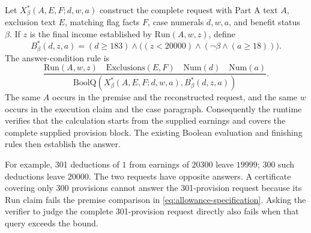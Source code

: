\documentclass[11pt,twoside]{article}
\theoremstyle{definition}
\begin{document}
Let $X^*_{\beta}(A,E,F;d,w,a)$ construct the complete request with Part A text
$A$, exclusion text $E$, matching flag facts $F$, case numerals $d,w,a$, and
benefit status $\beta$. If $z$ is the final income established by
$\mathrm{Run}(A,w,z)$, define
\begin{equation}
 B^*_{\beta}(d,z,a)
   =(d\ge183)\wedge\bigl((z<20000)\wedge(\neg\beta\wedge(a\ge18))\bigr).
\end{equation}
The answer-condition rule is
\begin{equation}
 \frac{\mathrm{Run}(A,w,z)\quad \mathrm{Exclusions}(E,F)\quad
       \mathrm{Num}(d)\quad \mathrm{Num}(a)}
 {\mathrm{BoolQ}(X^*_{\beta}(A,E,F;d,w,a),B^*_{\beta}(d,z,a))}.
 \label{eq:allowance-specification}
\end{equation}
The same $A$ occurs in the premise and the reconstructed request, and the same
$w$ occurs in the execution claim and the case paragraph. Consequently the
runtime verifies that the calculation starts from the supplied earnings and
covers the complete supplied provision block. The existing Boolean evaluation
and finishing rules then establish the answer.

For example, 301 deductions of $1$ from earnings of $20300$ leave $19999$;
300 such deductions leave $20000$. The two requests have opposite answers.
A certificate covering only 300 provisions cannot answer the 301-provision
request because its $\mathrm{Run}$ claim fails the premise comparison in
\cref{eq:allowance-specification}. Asking the verifier to judge the complete
301-provision request directly also fails when that query exceeds the bound.
\end{document}
